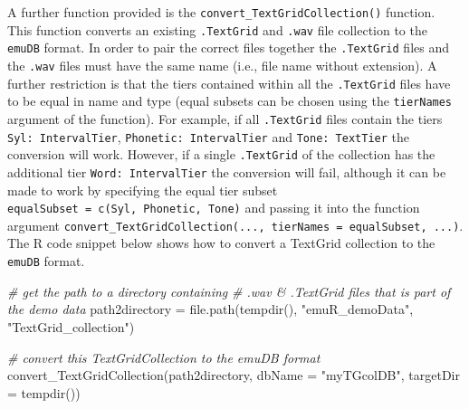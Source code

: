 \documentclass[
]{book}
\newenvironment{Shaded}{\begin{snugshade}}{\end{snugshade}}
\newcommand{\AttributeTok}[1]{\textcolor[rgb]{0.77,0.63,0.00}{#1}}
\newcommand{\CommentTok}[1]{\textcolor[rgb]{0.56,0.35,0.01}{\textit{#1}}}
\newcommand{\FunctionTok}[1]{\textcolor[rgb]{0.00,0.00,0.00}{#1}}
\newcommand{\NormalTok}[1]{#1}
\newcommand{\OtherTok}[1]{\textcolor[rgb]{0.56,0.35,0.01}{#1}}
\newcommand{\StringTok}[1]{\textcolor[rgb]{0.31,0.60,0.02}{#1}}
\begin{document}
A further function provided is the \texttt{convert\_TextGridCollection()} function. This function converts an existing \texttt{.TextGrid} and \texttt{.wav} file collection to the \texttt{emuDB} format. In order to pair the correct files together the \texttt{.TextGrid} files and the \texttt{.wav} files must have the same name (i.e., file name without extension). A further restriction is that the tiers contained within all the \texttt{.TextGrid} files have to be equal in name and type (equal subsets can be chosen using the \texttt{tierNames} argument of the function). For example, if all \texttt{.TextGrid} files contain the tiers \texttt{Syl:\ IntervalTier}, \texttt{Phonetic:\ IntervalTier} and \texttt{Tone:\ TextTier} the conversion will work. However, if a single \texttt{.TextGrid} of the collection has the additional tier \texttt{Word:\ IntervalTier} the conversion will fail, although it can be made to work by specifying the equal tier subset \texttt{equalSubset\ =\ c(\textquotesingle{}Syl\textquotesingle{},\ \textquotesingle{}Phonetic\textquotesingle{},\ \textquotesingle{}Tone\textquotesingle{})} and passing it into the function argument \texttt{convert\_TextGridCollection(...,\ tierNames\ =\ equalSubset,\ ...)}. The R code snippet below shows how to convert a TextGrid collection to the \texttt{emuDB} format.

\begin{Shaded}
\begin{Highlighting}[]
\CommentTok{\# get the path to a directory containing}
\CommentTok{\# .wav \& .TextGrid files that is part of the demo data}
\NormalTok{path2directory }\OtherTok{=} \FunctionTok{file.path}\NormalTok{(}\FunctionTok{tempdir}\NormalTok{(),}
                           \StringTok{"emuR\_demoData"}\NormalTok{,}
                           \StringTok{"TextGrid\_collection"}\NormalTok{)}

\CommentTok{\# convert this TextGridCollection to the emuDB format}
\FunctionTok{convert\_TextGridCollection}\NormalTok{(path2directory, }
                           \AttributeTok{dbName =} \StringTok{"myTGcolDB"}\NormalTok{,}
                           \AttributeTok{targetDir =} \FunctionTok{tempdir}\NormalTok{())}
\end{Highlighting}
\end{Shaded}
\end{document}
